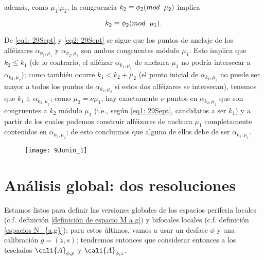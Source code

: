 \begin{dem}
\begin{itemize}
además, como $\mu_{1} | \mu_{2} $, 
la congruencia 
$k_{2} \equiv \phi_{2} (mod \hspace{0.2cm} \mu_{2})$ 
implica 

\begin{equation} \label{eq2: 29Sept}
k_{2} \equiv \phi_{2} (mod \hspace{0.2cm} \mu_{1}).
\end{equation}

De \eqref{eq1: 29Sept}
y \eqref{eq2: 29Sept}
se sigue que los puntos de anclaje de los
alféizares 
$\alpha_{\phi_{1}, \mu_{1}}$ y $\alpha_{\phi_{2}, \mu_{2}}$ son 
ambos congruentes
módulo $\mu_{1}$. Esto implica que
$k_{2} \leq k_{1}$ (de lo contrario, el alféizar 
$\alpha_{k_{1}, \mu_{1}} $
de anchura $\mu_{1}$ no podría intersecar a $\alpha_{k_{2}, \mu_{2}} $);
como también ocurre $k_{1}< k_{2}+ \mu_{2}$ (el punto inicial
de $\alpha_{k_{1}, \mu_{1}}$ no puede ser mayor a todos los
puntos de $\alpha_{k_{2}, \mu_{2}} $ si estos dos alféizares 
se intersecan), tenemos que $k_{1} \in \alpha_{k_{2}, \mu_{2}}$;
como $\mu_{2}= \nu \mu_{1}$, hay exactamente $\nu$ 
puntos en $\alpha_{k_{2}, \mu_{2}} $ que son congruentes a
$k_{2}$ módulo $\mu_{1}$
(i.e., según \eqref{eq1: 29Sept}, candidatos a ser $k_{1}$)
y a partir de los cuales 
podemos construir alféizares de anchura $\mu_{1}$
completamente contenidos en $\alpha_{k_{2}, \mu_{2}} $;
de esto concluimos que alguno de ellos debe de ser
$\alpha_{k_{1}, \mu_{1}}$.  

\begin{figure}[H]
	\centering
	\texttt{[image: 9Junio\_1]}
\end{figure}


\QEDB
\end{itemize}
\end{dem}


\begin{comment}
3.- GLobal, una resolución
\phi: desfase
\mu: anchura
Teselado: A_{\pi, \mu}
Espacios periferia X_{\phi, \mu}

\end{comment}


\section{Análisis global: dos resoluciones}
Estamos listos para definir las versiones globales 
de los
espacios periferia locales
(c.f. definición \ref{definición de espacio M a g})
y bifocales locales
(c.f. definición \ref{espacios N_{a,g}});
para estos
últimos, vamos a usar 
un desfase $\phi$ y
una calibración $g=(z,s)$;
tendremos entonces que
considerar entonces a los teselados
$\cali{A}_{\phi, p}$ y $\cali{A}_{\phi, z}$.

